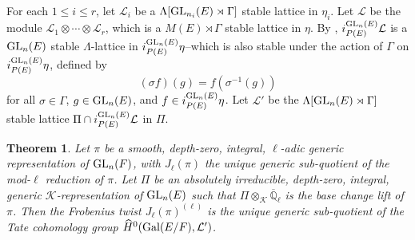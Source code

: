 \documentclass[10pt, reqno]{amsart}
\theoremstyle{plain}
\numberwithin{equation}{section} \newcommand{\di}{\operatorname{dim}}
\newtheorem{theorem}{Theorem}[subsection]
\begin{document}
\subsubsection{}
For each $1\leq i\leq r$, let $\mathcal{L}_i$ be a
$\Lambda[{\rm GL}_{n_i}(E)\rtimes \Gamma]$ stable lattice in
$\eta_i$. Let $\mathcal{L}$ be the module
$\mathcal{L}_1\otimes\cdots\otimes \mathcal{L}_r$, which is a
$M(E)\rtimes\Gamma$ stable lattice in $\eta$. By
\cite[Chapter I, Section 9.3]{Vigneras_modl_book},
$i_{P(E)}^{{\rm GL}_n(E)}\mathcal{L}$ is a ${\rm GL}_n(E)$ stable
$\Lambda$-lattice in $i_{P(E)}^{{\rm GL}_n(E)}\eta$--which is also
stable under the action of $\Gamma$ on $i_{P(E)}^{{\rm GL}_n(E)}\eta$,
defined by
$$ (\sigma f)(g) = f(\sigma^{-1}(g)) $$
for all $\sigma\in \Gamma$, $g\in {\rm GL}_n(E)$, and
$f\in i_{P(E)}^{{\rm GL}_n(E)}\eta$.  Let $\mathcal{L}'$ be the
$\Lambda[{\rm GL}_n(E)\rtimes\Gamma]$ stable lattice
$\Pi\cap i_{P(E)}^{{\rm GL}_n(E)} \mathcal{L}$ in $\Pi$.
\begin{theorem}
Let $\pi$ be a smooth, depth-zero,
integral, $\ell$-adic generic 
representation of ${\rm GL}_n(F)$, with
$J_\ell(\pi)$ the unique generic 
sub-quotient of the mod-$\ell$ reduction
of $\pi$. Let $\Pi$ be an 
absolutely irreducible, depth-zero,
integral, generic $\mathcal{K}$-representation 
of ${\rm GL}_n(E)$ such that
$\Pi\otimes_{\mathcal{K}} 
\overline{\mathbb{Q}}_\ell$ is the base
change lift of $\pi$. Then 
the Frobenius twist $J_\ell(\pi)^{(\ell)}$ is
the unique generic sub-quotient 
of the Tate cohomology group
$\widehat{H}^0({\rm Gal}(E/F), \mathcal{L}')$.
\end{theorem}
\end{document}
